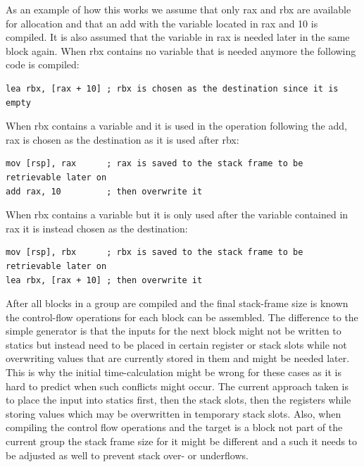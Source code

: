 \documentclass[course=eragp]{aspdoc}
\begin{document}
\par
As an example of how this works we assume that only rax and rbx are available for allocation and that an add with the variable located in rax and 10 is compiled.
It is also assumed that the variable in rax is needed later in the same block again.
When rbx contains no variable that is needed anymore the following code is compiled:
\begin{lstlisting}[language={[x86masm]Assembler},float=h]
lea rbx, [rax + 10] ; rbx is chosen as the destination since it is empty
\end{lstlisting}
\FloatBarrier

When rbx contains a variable and it is used in the operation following the add, rax is chosen as the destination as it is used after rbx:
\begin{lstlisting}[language={[x86masm]Assembler},float=h]
mov [rsp], rax      ; rax is saved to the stack frame to be retrievable later on
add rax, 10         ; then overwrite it
\end{lstlisting}
\FloatBarrier

When rbx contains a variable but it is only used after the variable contained in rax it is instead chosen as the destination:
\begin{lstlisting}[language={[x86masm]Assembler},float=h]
mov [rsp], rbx      ; rbx is saved to the stack frame to be retrievable later on
lea rbx, [rax + 10] ; then overwrite it
\end{lstlisting}

\FloatBarrier
\par

After all blocks in a group are compiled and the final stack-frame size is known the control-flow operations for each block can be assembled.
The difference to the simple generator is that the inputs for the next block might not be written to statics but instead need to be placed in certain register or stack slots
while not overwriting values that are currently stored in them and might be needed later.
This is why the initial time-calculation might be wrong for these cases as it is hard to predict when such
conflicts might occur. The current approach taken is to place the input into statics first, then the stack slots, then the registers while storing values which may be overwritten in temporary stack slots.
Also, when compiling the control flow operations and the target is a block not part of the current group the stack frame size for it might be different and a such it needs to be adjusted as well to prevent stack over- or underflows.
\end{document}
